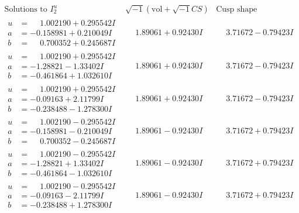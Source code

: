 \documentclass[1p]{elsarticle_modified}
\theoremstyle{definition}
\newcommand{\I}{\sqrt{-1}}
\begin{document}
$$\begin{array}{c|c|c}  
\text{Solutions to }I^u_{2}& \I (\text{vol} + \sqrt{-1}CS) & \text{Cusp shape}\\
 \hline 
\begin{aligned}
u &= \phantom{-}1.002190 + 0.295542 I \\
a &= -0.158981 + 0.210049 I \\
b &= \phantom{-}0.700352 + 0.245687 I\end{aligned}
 & \phantom{-}1.89061 + 0.92430 I & \phantom{-}3.71672 - 0.79423 I \\ \hline\begin{aligned}
u &= \phantom{-}1.002190 + 0.295542 I \\
a &= -1.28821 - 1.33402 I \\
b &= -0.461864 + 1.032610 I\end{aligned}
 & \phantom{-}1.89061 + 0.92430 I & \phantom{-}3.71672 - 0.79423 I \\ \hline\begin{aligned}
u &= \phantom{-}1.002190 + 0.295542 I \\
a &= -0.09163 + 2.11799 I \\
b &= -0.238488 - 1.278300 I\end{aligned}
 & \phantom{-}1.89061 + 0.92430 I & \phantom{-}3.71672 - 0.79423 I \\ \hline\begin{aligned}
u &= \phantom{-}1.002190 - 0.295542 I \\
a &= -0.158981 - 0.210049 I \\
b &= \phantom{-}0.700352 - 0.245687 I\end{aligned}
 & \phantom{-}1.89061 - 0.92430 I & \phantom{-}3.71672 + 0.79423 I \\ \hline\begin{aligned}
u &= \phantom{-}1.002190 - 0.295542 I \\
a &= -1.28821 + 1.33402 I \\
b &= -0.461864 - 1.032610 I\end{aligned}
 & \phantom{-}1.89061 - 0.92430 I & \phantom{-}3.71672 + 0.79423 I \\ \hline\begin{aligned}
u &= \phantom{-}1.002190 - 0.295542 I \\
a &= -0.09163 - 2.11799 I \\
b &= -0.238488 + 1.278300 I\end{aligned}
 & \phantom{-}1.89061 - 0.92430 I & \phantom{-}3.71672 + 0.79423 I \\ \hline\begin{aligned}

\end{aligned}
\end{array}$$
\end{document}
